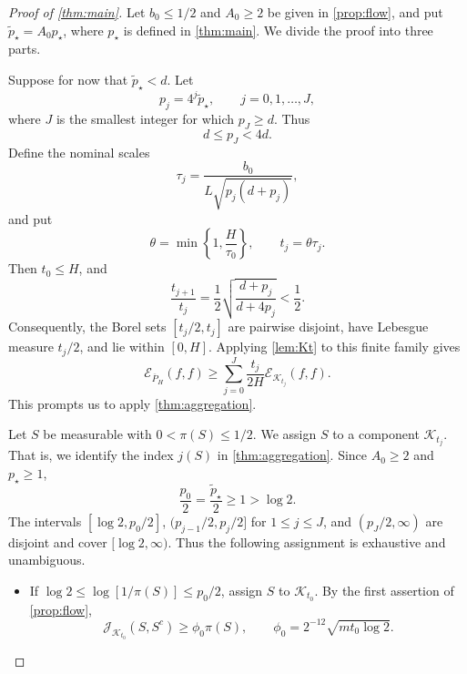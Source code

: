 \documentclass[11pt]{article}
\newcommand{\cE}{\mathcal E}
\newcommand{\cK}{\mathcal K}
\newcommand{\1}{\mathbf 1}
\begin{document}
	\begin{proof}[Proof of \cref{thm:main}]
		Let $b_0\leq1/2$ and $A_0\geq 2$ be given in \cref{prop:flow}, and
		put $\widetilde p_\star=A_0p_\star$, where $p_\star$ is defined in \cref{thm:main}.  We divide the proof into
		three parts.
		
		\bigskip
		
		
		Suppose for now that \(\widetilde p_\star<d\).  Let
		\begin{equation}\label{eq:pj}
			p_j=4^j \widetilde p_\star,
			\qquad j=0,1,\ldots,J,
		\end{equation}
		where \(J\) is the smallest integer for which \(p_J\geq d\).  Thus
		\begin{equation}\label{eq:pJ-range}
			d\leq p_J<4d.
		\end{equation}
		Define the nominal scales
		\begin{equation*}
			\tau_j=
			\frac{b_0}{L\sqrt{p_j(d+p_j)}},
		\end{equation*}
		and put
		\begin{equation}\label{eq:theta-tj}
			\theta=\min\left\{1,\frac{H}{\tau_0}\right\},
			\qquad
			t_j=\theta\tau_j.
		\end{equation}
		Then \(t_0\leq H\), and
		\[
		\frac{t_{j+1}}{t_j}
		=\frac12\sqrt{\frac{d+p_j}{d+4p_j}}
		<\frac12.
		\]
		Consequently, the Borel sets $[t_j/2,t_j]$
		are pairwise disjoint, have Lebesgue measure \(t_j/2\), and lie within $[0,H]$.
		Applying \cref{lem:Kt} to this finite
		family gives
		\begin{equation}\label{eq:ladder-dirichlet}
			\cE_{\overline P_H}(f,f)
			\geq
			\sum_{j=0}^J\frac{t_j}{2H}\cE_{\cK_{t_j}}(f,f).
		\end{equation}
		This prompts us to apply \cref{thm:aggregation}.
		
		Let \(S\) be measurable with \(0<\pi(S)\leq1/2\).
		We assign $S$ to a component $\cK_{t_j}$.
		That is, we identify the index $j(S)$ in \cref{thm:aggregation}.
		Since \(A_0\geq2\) and \(p_\star\geq1\),
		\[
		\frac{p_0}{2}=\frac{\widetilde p_\star}{2}
		\geq1>\log2.
		\] 
		The intervals
		\([\log 2,p_0/2]\), \((p_{j-1}/2,p_j/2]\) for \(1\leq j\leq J\), and
		\((p_J/2,\infty)\) are disjoint and cover \([\log 2,\infty)\).  Thus the
		following assignment is exhaustive and unambiguous.
		
		\begin{itemize}[leftmargin=2em]
			\item If \(\log 2\leq\log[1/\pi(S)]\leq p_0/2\), assign \(S\) to \(\cK_{t_0}\).
			By the first assertion of \cref{prop:flow},
			\[
			\mathcal{J}_{\cK_{t_0}}(S,S^c)
			\geq
			\phi_0\pi(S),
			\qquad
			\phi_0=2^{-12}\sqrt{m t_0\log 2}.
			\]
			

\end{itemize}
\end{proof}
\end{document}
